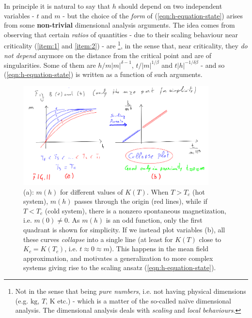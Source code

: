 \documentclass[../../main.tex]{subfiles}
\begin{document}
In principle it is natural to say that $h$ should depend on two independent variables - $t$ and $m$ - but the choice of the \textit{form} of (\ref{eqn:h-equation-state}) arises from some \textbf{non-trivial} dimensional analysis arguments. The idea comes from observing that certain \textit{ratios} of quantities - due to their scaling behaviour near criticality (\ref{item:1} and \ref{item:2}) - are \footnote{Not in the sense that being \textit{pure numbers}, i.e. not having physical dimensions (e.g. $\si{\kilo\g}$, $\si{T}$, $\si{\K}$ etc.) - which is a matter of the so-called na\"ive dimensional analysis. The  dimensional analysis deals with \textit{scaling} and \textit{local behaviours}.}, in the sense that, near criticality, they \textit{do not depend} anymore on the distance from the critical point and are  of singularities. Some of them are $h/m|m|^{\delta-1}$, $t/|m|^{1/\beta}$ and $t|h|^{-1/\delta \beta}$ - and so (\ref{eqn:h-equation-state}) is written as a function of such arguments.


\begin{figure}[H]
    \centering
    \includegraphics[width=0.9\textwidth]{collapse_plot.png}
    \caption{(a): $m(h)$ for different values of $K(T)$. When $T > T_c$ (hot system), $m(h)$ passes through the origin (red lines), while if $T < T_c$ (cold system), there is a nonzero spontaneous magnetization, i.e. $m(0) \neq 0$. As $m(h)$ is an odd function, only the first quadrant is shown for simplicity. If we instead plot  variables (b), all these curves \textit{collapse} into a single line (at least for $K(T)$ close to $K_c = K(T_c)$, i.e. $t \approx 0 \approx m$). This happens in the mean field approximation, and motivates a generalization to more complex systems giving rise to the scaling ansatz (\ref{eqn:h-equation-state}).}
    \label{fig:collapse_plot}
\end{figure}
\end{document}
